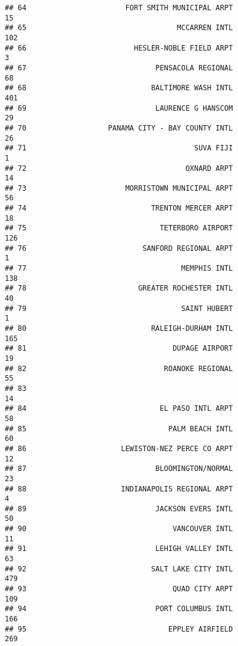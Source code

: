 \documentclass[
]{article}
\begin{document}
\begin{verbatim}
## 64                       FORT SMITH MUNICIPAL ARPT                          15
## 65                                   MCCARREN INTL                         102
## 66                         HESLER-NOBLE FIELD ARPT                           3
## 67                              PENSACOLA REGIONAL                          68
## 68                             BALTIMORE WASH INTL                         401
## 69                              LAURENCE G HANSCOM                          29
## 70                   PANAMA CITY - BAY COUNTY INTL                          26
## 71                                       SUVA FIJI                           1
## 72                                     OXNARD ARPT                          14
## 73                       MORRISTOWN MUNICIPAL ARPT                          56
## 74                             TRENTON MERCER ARPT                          18
## 75                               TETERBORO AIRPORT                         126
## 76                           SANFORD REGIONAL ARPT                           1
## 77                                    MEMPHIS INTL                         138
## 78                          GREATER ROCHESTER INTL                          40
## 79                                    SAINT HUBERT                           1
## 80                             RALEIGH-DURHAM INTL                         165
## 81                                  DUPAGE AIRPORT                          19
## 82                                ROANOKE REGIONAL                          55
## 83                                                                          14
## 84                               EL PASO INTL ARPT                          58
## 85                                 PALM BEACH INTL                          60
## 86                      LEWISTON-NEZ PERCE CO ARPT                          12
## 87                              BLOOMINGTON/NORMAL                          23
## 88                      INDIANAPOLIS REGIONAL ARPT                           4
## 89                              JACKSON EVERS INTL                          50
## 90                                  VANCOUVER INTL                          11
## 91                              LEHIGH VALLEY INTL                          63
## 92                             SALT LAKE CITY INTL                         479
## 93                                  QUAD CITY ARPT                         109
## 94                              PORT COLUMBUS INTL                         166
## 95                                 EPPLEY AIRFIELD                         269

\end{verbatim}
\end{document}
